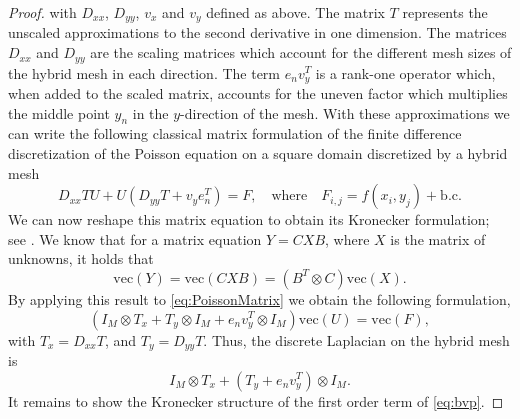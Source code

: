 \begin{proof}
with $D_{xx}$, $D_{yy}$, $v_x$ and $v_y$ defined as above.  The matrix $T$ represents the unscaled approximations to the second derivative in one dimension. The matrices $D_{xx}$ and $D_{yy}$ are the scaling matrices which account for the different mesh sizes of the hybrid mesh in each direction. The term $e_nv_y^T$ is a rank-one operator which, when added to the scaled matrix, accounts for the uneven factor which multiplies the middle point $y_n$ in the $y$-direction of the mesh. With these approximations we can write the following classical matrix formulation of the finite difference discretization of the Poisson equation on a square domain discretized by a hybrid mesh
\begin{equation}\label{eq:PoissonMatrix}
D_{xx}TU+ U(D_{yy}T+v_ye_n^T)=F,\quad\text{where}\quad F_{i,j}=f(x_i,y_j) + \text{b.c.}
\end{equation}
We can now reshape this matrix equation to obtain its Kronecker formulation; see \cite[Section 1.3.7]{GolVan13}. We know that for a matrix equation $Y=CXB$, where $X$ is the matrix of unknowns, it holds that
\[ \text{vec}(Y)=\text{vec}(CXB)=(B^T\otimes C)\text{vec}(X).\]
By applying this result to \eqref{eq:PoissonMatrix} we obtain the following formulation,
 \begin{equation}\label{eq:PoissonKron}
 (I_M\otimes T_x + T_y\otimes I_M+e_nv_y^T \otimes I_M)\text{vec}(U)=\text{vec}(F),
 \end{equation}
 with $T_x=D_{xx}T$, and $T_y=D_{yy}T$. Thus, the discrete Laplacian on the hybrid mesh is
 \begin{equation}\label{eq:PoissonKron}
I_M\otimes T_x +(T_y+ e_nv_y^T) \otimes I_M.
 \end{equation}
It remains to show the Kronecker structure of the first order term of \eqref{eq:bvp}.


\end{proof}
